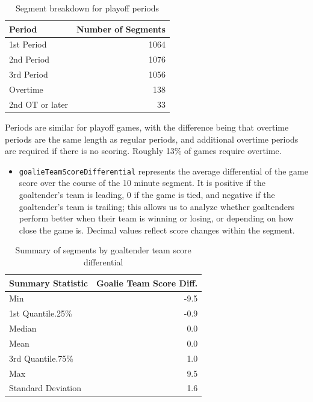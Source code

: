 \documentclass[
  letterpaper,
  DIV=11,
  numbers=noendperiod]{scrartcl}
\providecommand{\tightlist}{%
  \setlength{\itemsep}{0pt}\setlength{\parskip}{0pt}}\usepackage{longtable,booktabs,array}
\begin{document}
\begin{longtable}[]{@{}lr@{}}

\caption{\label{tbl-4}Segment breakdown for playoff periods}

\tabularnewline

\toprule\noalign{}
Period & Number of Segments \\
\midrule\noalign{}
\endhead
\bottomrule\noalign{}
\endlastfoot
1st Period & 1064 \\
2nd Period & 1076 \\
3rd Period & 1056 \\
Overtime & 138 \\
2nd OT or later & 33 \\

\end{longtable}

Periods are similar for playoff games, with the difference being that
overtime periods are the same length as regular periods, and additional
overtime periods are required if there is no scoring. Roughly 13\% of
games require overtime.

\begin{itemize}
\tightlist
\item
  \texttt{goalieTeamScoreDifferential} represents the average
  differential of the game score over the course of the 10 minute
  segment. It is positive if the goaltender's team is leading, 0 if the
  game is tied, and negative if the goaltender's team is trailing; this
  allows us to analyze whether goaltenders perform better when their
  team is winning or losing, or depending on how close the game is.
  Decimal values reflect score changes within the segment.
\end{itemize}

\begin{longtable}[]{@{}lr@{}}

\caption{\label{tbl-5}Summary of segments by goaltender team score
differential}

\tabularnewline

\toprule\noalign{}
Summary Statistic & Goalie Team Score Diff. \\
\midrule\noalign{}
\endhead
\bottomrule\noalign{}
\endlastfoot
Min & -9.5 \\
1st Quantile.25\% & -0.9 \\
Median & 0.0 \\
Mean & 0.0 \\
3rd Quantile.75\% & 1.0 \\
Max & 9.5 \\
Standard Deviation & 1.6 \\

\end{longtable}
\end{document}

